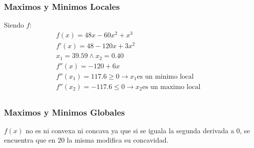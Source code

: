 \begin{homeworkProblem}
\subsubsection{Maximos y Minimos Locales}
Siendo $f$:
\begin{align*}
    f(x) = 48x - 60x^2 + x^3 \\
    f'(x) = 48 - 120x + 3x^2 \\
    x_1 = 39.59 \wedge x_2 = 0.40 \\
    f''(x) = -120 + 6x \\
    f''(x_1) = 117.6 \geq 0 \rightarrow x_1 \text{es un minimo local}\\
    f''(x_2) = -117.6 \leq 0 \rightarrow x_2 \text{es un maximo local}\\
\end{align*}

\subsubsection{Maximos y Minimos Globales}
$f(x)$ no es ni convexa ni concava ya que si se iguala la segunda derivada a 0, se encuentra que en 20 la misma modifica su concavidad.
\end{homeworkProblem}